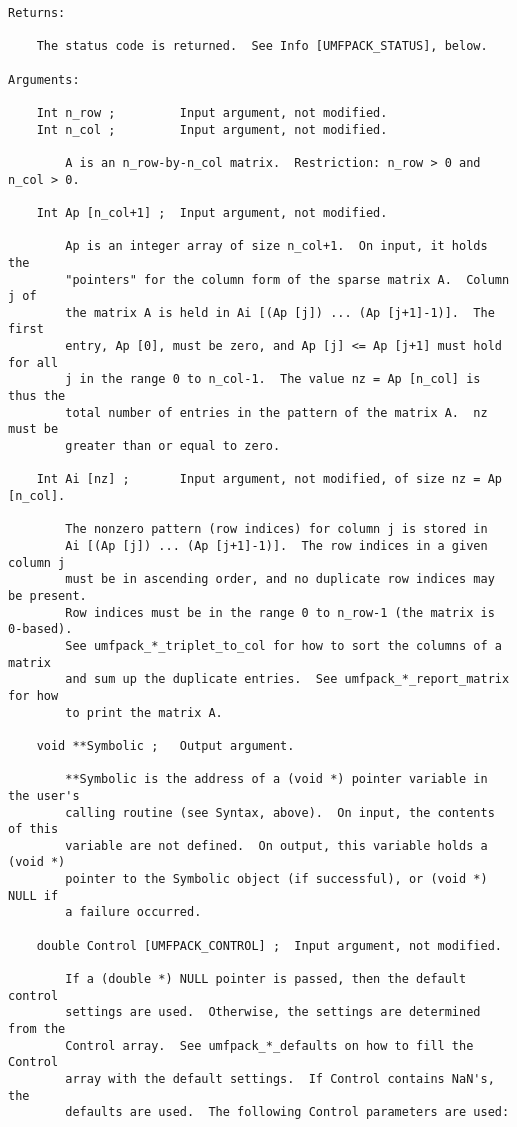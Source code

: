 {\begin{verbatim}
Returns:

    The status code is returned.  See Info [UMFPACK_STATUS], below.

Arguments:

    Int n_row ;         Input argument, not modified.
    Int n_col ;         Input argument, not modified.

        A is an n_row-by-n_col matrix.  Restriction: n_row > 0 and n_col > 0.

    Int Ap [n_col+1] ;  Input argument, not modified.

        Ap is an integer array of size n_col+1.  On input, it holds the
        "pointers" for the column form of the sparse matrix A.  Column j of
        the matrix A is held in Ai [(Ap [j]) ... (Ap [j+1]-1)].  The first
        entry, Ap [0], must be zero, and Ap [j] <= Ap [j+1] must hold for all
        j in the range 0 to n_col-1.  The value nz = Ap [n_col] is thus the
        total number of entries in the pattern of the matrix A.  nz must be
        greater than or equal to zero.

    Int Ai [nz] ;       Input argument, not modified, of size nz = Ap [n_col].

        The nonzero pattern (row indices) for column j is stored in
        Ai [(Ap [j]) ... (Ap [j+1]-1)].  The row indices in a given column j
        must be in ascending order, and no duplicate row indices may be present.
        Row indices must be in the range 0 to n_row-1 (the matrix is 0-based).
        See umfpack_*_triplet_to_col for how to sort the columns of a matrix
        and sum up the duplicate entries.  See umfpack_*_report_matrix for how
        to print the matrix A.

    void **Symbolic ;   Output argument.

        **Symbolic is the address of a (void *) pointer variable in the user's
        calling routine (see Syntax, above).  On input, the contents of this
        variable are not defined.  On output, this variable holds a (void *)
        pointer to the Symbolic object (if successful), or (void *) NULL if
        a failure occurred.

    double Control [UMFPACK_CONTROL] ;  Input argument, not modified.

        If a (double *) NULL pointer is passed, then the default control
        settings are used.  Otherwise, the settings are determined from the
        Control array.  See umfpack_*_defaults on how to fill the Control
        array with the default settings.  If Control contains NaN's, the
        defaults are used.  The following Control parameters are used:


\end{verbatim}}
